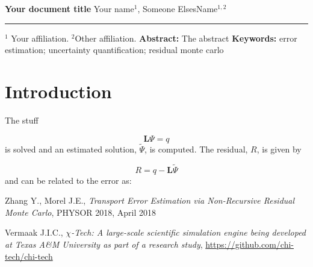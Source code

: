 \documentclass[10pt,letterpaper,notitlepage]{article}
\numberwithin{equation}{section}
\newcommand{\DOCTITLE}{Your document title
}
\begin{document}
\noindent
{\LARGE\textbf{\DOCTITLE}}
\newline
\newline
\newline
\noindent
{\Large Your name${^1}$, Someone ElsesName$^{1,2}$}
\newline
\noindent\rule{\textwidth}{1pt}
{\small $^1$ Your affiliation.}
\newline\noindent
{\small $^2$Other affiliation.}
\newline
\newline
\textbf{Abstract:}\newline\noindent
The abstract
\newline
\newline\noindent
{\small
\textbf{Keywords:} error estimation; uncertainty quantification; residual monte carlo}

\section{Introduction}
The stuff

\begin{equation}
\mathbf{L}\Psi = q
\end{equation}
\newline \noindent
is solved and an estimated solution, $\tilde{\Psi}$, is computed. The residual, $R$, is given by

\begin{equation}
R = q - \mathbf{L}\tilde{\Psi}
\end{equation}
\newline \noindent
and can be related to the error as:

\begin{thebibliography}{1}
    
     Zhang Y., Morel J.E., {\em Transport Error Estimation via Non-Recursive Residual Monte Carlo}, PHYSOR 2018, April 2018
    
     Vermaak J.I.C., {\em $\chi$-Tech: A large-scale scientific simulation engine being developed at Texas A\&M University as part of a research study}, \url{https://github.com/chi-tech/chi-tech}
    
    
\end{thebibliography}
\end{document}
